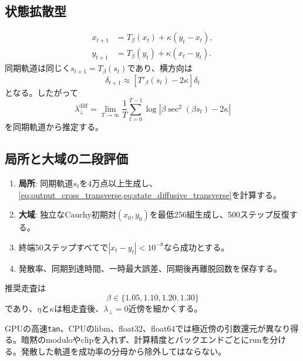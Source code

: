 \documentclass[a4paper,11pt,oneside,openany]{ltjsbook}
\newcommand{\code}[1]{\texttt{#1}}
\begin{document}
\subsection{状態拡散型}

\begin{align}
  x_{t+1}&=T_\beta(x_t)+\kappa(y_t-x_t),\\
  y_{t+1}&=T_\beta(y_t)+\kappa(x_t-y_t).
  \label{eq:state_diffusive_tangent}
\end{align}
同期軌道は同じく\(s_{t+1}=T_\beta(s_t)\)であり、横方向は
\begin{equation}
  \delta_{t+1}
  \approx\left[T'_\beta(s_t)-2\kappa\right]\delta_t
  \label{eq:state_diffusive_variational}
\end{equation}
となる。したがって
\begin{equation}
  \lambda_\perp^{\mathrm{diff}}
  =\lim_{T\to\infty}\frac1T
    \sum_{t=0}^{T-1}
    \log\left|\beta\sec^2(\beta s_t)-2\kappa\right|
  \label{eq:state_diffusive_transverse}
\end{equation}
を同期軌道から推定する。

\subsection{局所と大域の二段評価}

\begin{enumerate}
  \item \textbf{局所}: 同期軌道\(s_t\)を4万点以上生成し、\cref{eq:output_cross_transverse,eq:state_diffusive_transverse}を計算する。
  \item \textbf{大域}: 独立なCauchy初期対\((x_0,y_0)\)を最低256組生成し、500ステップ反復する。
  \item 終端50ステップすべてで\(|x_t-y_t|<10^{-8}\)なら成功とする。
  \item 発散率、同期到達時間、一時最大誤差、同期後再離脱回数を保存する。
\end{enumerate}

推奨走査は
\begin{equation}
  \beta\in\{1.05,1.10,1.20,1.30\}
  \label{eq:e3b_beta_grid}
\end{equation}
であり、\(\eta\)と\(\kappa\)は粗走査後、\(\lambda_\perp=0\)近傍を細かくする。

\begin{cautionbox}
GPUの高速\code{tan}、CPUのlibm、float32、float64では極近傍の引数還元が異なり得る。暗黙のmoduloやclipを入れず、計算精度とバックエンドごとにrunを分ける。発散した軌道を成功率の分母から除外してはならない。
\end{cautionbox}
\end{document}
